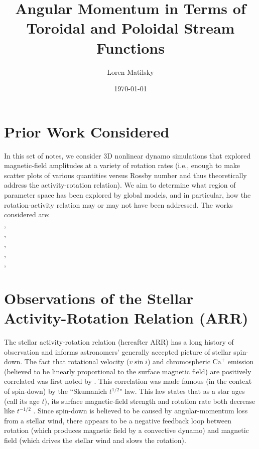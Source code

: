 \documentclass[12pt]{article} %
\date{\today}
\author{Loren Matilsky}
\title{Angular Momentum in Terms of Toroidal and Poloidal Stream Functions}
\begin{document}
	\maketitle

\section{Prior Work Considered}
In this set of notes, we consider 3D nonlinear dynamo simulations that explored magnetic-field amplitudes at a variety of rotation rates (i.e., enough to make scatter plots of various quantities versus Rossby number and thus theoretically address the activity-rotation relation). We aim to determine what region of parameter space has been explored by global models, and in particular, how the rotation-activity relation may or may not have been addressed. The works considered are:\\

\citet{Christensen2006},\\

\citet{Christensen2009},\\

\citet{Strugarek2017},\\

\citet{Guerrero2019},\\

\citet{Brun2022},\\

\section{Observations of the Stellar Activity-Rotation Relation (ARR)}
The stellar activity-rotation relation (hereafter ARR) has a long history of observation and informs astronomers' generally accepted picture of stellar spin-down. The fact that rotational velocity ($v\sin i$) and chromospheric $\text{Ca}^+$ emission (believed to be linearly proportional to the surface magnetic field) are positively correlated was first noted by \citet{Kraft1967}. This correlation was made famous (in the context of spin-down) by the ``Skumanich $t^{1/2}$" law. This law states that as a star ages (call its age $t$), its surface magnetic-field strength and rotation rate both decrease like $t^{-1/2}$ \citep{Skumanich1972}. Since spin-down is believed to be caused by angular-momentum loss from a stellar wind, there appears to be a negative feedback loop between rotation (which produces magnetic field by a convective dynamo) and magnetic field (which drives the stellar wind and slows the rotation). 
\end{document}
